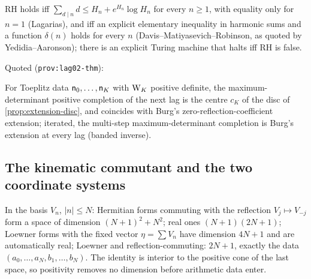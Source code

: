 \begin{citedfact}[RH is a $\Pi^0_1$ sentence]
\label{cit:rh-pi01}
RH holds iff $\sum_{d\mid n}d\le H_n+e^{H_n}\log H_n$ for every $n\ge1$, with equality only for $n = 1$ (Lagarias),
and iff an explicit elementary inequality in harmonic sums and a function $\delta(n)$ holds for every $n$
(Davis--Matiyasevich--Robinson, as quoted by Yedidia--Aaronson); there is an explicit Turing machine that halts
iff RH is false.

\par\noindent Quoted (\texttt{prov:lag02-thm}):
{\small\texttt{}}
\end{citedfact}

\begin{proposition}
\label{prop:burg-is-maxdet}
For Toeplitz data $\mathsf n_{0},\dots,\mathsf n_{K}$ with $\mathrm{W}_K$ positive definite, the maximum-determinant
positive completion of the next lag is the centre $c_K$ of the disc of \cref{prop:extension-disc}, and
coincides with Burg's zero-reflection-coefficient extension; iterated, the multi-step maximum-determinant
completion is Burg's extension at every lag (banded inverse).
\end{proposition}

\subsection{The kinematic commutant and the two coordinate systems}

\begin{proposition}
\label{prop:window-kinematic-dimension}
In the basis $V_n$, $|n|\le N$: Hermitian forms commuting with the reflection $V_j\mapsto V_{-j}$ form a space
of dimension $(N+1)^2+N^2$; real ones $(N+1)(2N+1)$; Loewner forms with the fixed vector $\eta = \sum V_n$ have
dimension $4N+1$ and are automatically real; Loewner and reflection-commuting: $2N+1$, exactly the data
$(a_0,\dots,a_N,b_1,\dots,b_N)$. The identity is interior to the positive cone of the last space, so
positivity removes no dimension before arithmetic data enter.
\end{proposition}

